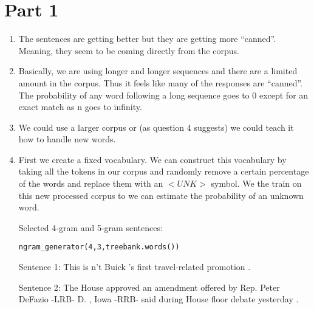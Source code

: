 \documentclass[11pt]{article}
\begin{document}
\noindent

\setlength{\parindent}{0pt}
\setlength{\parskip}{0.15in}

\headsep=0.3in

\section*{Part 1}

\begin{enumerate}

\item 

The sentences are getting better but they are getting more ``canned''. Meaning, they seem to be coming directly from the corpus.

\item 

Basically, we are using longer and longer sequences and there are a limited amount in the corpus. Thus it feels like many of the responses are ``canned''. The probability of any word following a long sequence goes to 0 except for an exact match as n goes to infinity.

\item 

We could use a larger corpus or (as question 4 suggests) we could teach it how to handle new words.

\item 

First we create a fixed vocabulary. We can construct this vocabulary by taking all the tokens in our corpus and randomly remove a certain percentage of the words and replace them with an $<UNK>$ symbol. We the train on this new processed corpus to we can estimate the probability of an unknown word.

Selected 4-gram and 5-gram sentences:

\tt{
\begin{verbatim}ngram_generator(4,3,treebank.words())\end{verbatim}

Sentence 1:  This is n't Buick 's first travel-related promotion . 

Sentence 2:  The House approved an amendment offered by Rep. Peter DeFazio -LRB- D. , Iowa -RRB- said during House floor debate yesterday . 

}
\end{enumerate}
\end{document}
